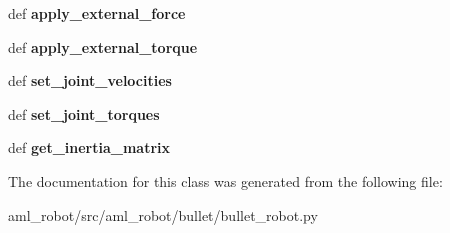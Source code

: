 \begin{DoxyCompactItemize}
\item 
\hypertarget{classaml__robot_1_1bullet_1_1bullet__robot_1_1_bullet_robot_a16cd3128a33a669b715262a6566e7412}{def {\bfseries apply\-\_\-external\-\_\-force}}\label{classaml__robot_1_1bullet_1_1bullet__robot_1_1_bullet_robot_a16cd3128a33a669b715262a6566e7412}

\item 
\hypertarget{classaml__robot_1_1bullet_1_1bullet__robot_1_1_bullet_robot_acb39fd8e2a984ee5bf7b2d4f22d3cfcf}{def {\bfseries apply\-\_\-external\-\_\-torque}}\label{classaml__robot_1_1bullet_1_1bullet__robot_1_1_bullet_robot_acb39fd8e2a984ee5bf7b2d4f22d3cfcf}

\item 
\hypertarget{classaml__robot_1_1bullet_1_1bullet__robot_1_1_bullet_robot_a6887b7c121e80a302f9e77dc94c9c39a}{def {\bfseries set\-\_\-joint\-\_\-velocities}}\label{classaml__robot_1_1bullet_1_1bullet__robot_1_1_bullet_robot_a6887b7c121e80a302f9e77dc94c9c39a}

\item 
\hypertarget{classaml__robot_1_1bullet_1_1bullet__robot_1_1_bullet_robot_ae26eef83ee4b61ab862e9c5221cce502}{def {\bfseries set\-\_\-joint\-\_\-torques}}\label{classaml__robot_1_1bullet_1_1bullet__robot_1_1_bullet_robot_ae26eef83ee4b61ab862e9c5221cce502}

\item 
\hypertarget{classaml__robot_1_1bullet_1_1bullet__robot_1_1_bullet_robot_aa6ede6bc549404e2b75464bec59714c7}{def {\bfseries get\-\_\-inertia\-\_\-matrix}}\label{classaml__robot_1_1bullet_1_1bullet__robot_1_1_bullet_robot_aa6ede6bc549404e2b75464bec59714c7}

\end{DoxyCompactItemize}


The documentation for this class was generated from the following file\-:\begin{DoxyCompactItemize}
\item 
aml\-\_\-robot/src/aml\-\_\-robot/bullet/bullet\-\_\-robot.\-py\end{DoxyCompactItemize}
